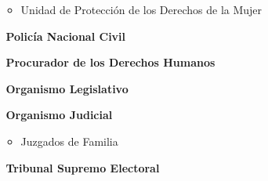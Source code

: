 \begin{itemize}
\begin{itemize}
			\item	 Unidad de Protección de los Derechos de la Mujer	
		\end{itemize}		
		\item[$ $] \textbf{Policía Nacional Civil}
		\item[$ $] \textbf{Procurador de los Derechos Humanos}
		\item[$ $] \textbf{Organismo Legislativo}		
		\item[$ $] \textbf{Organismo Judicial}					
		\begin{itemize}
			\item	 Juzgados de Familia	
		\end{itemize}
		\item[$ $] \textbf{Tribunal Supremo Electoral}					
	\end{itemize}
	
